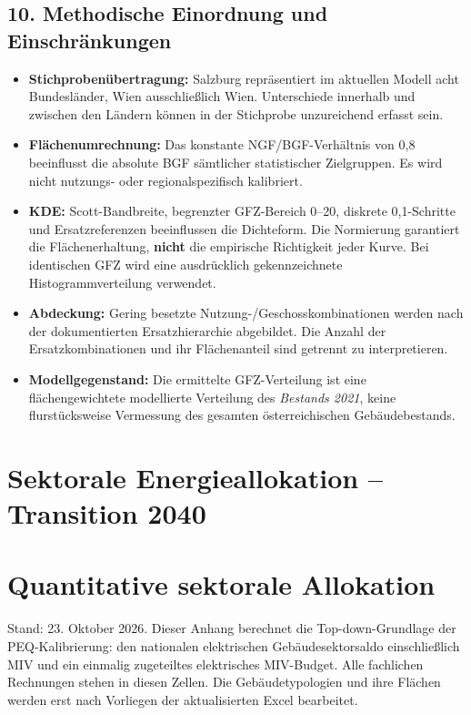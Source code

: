 \documentclass[
  ngerman,
  a4paper,
  DIV=11]{scrreprt}
\providecommand{\tightlist}{%
  \setlength{\itemsep}{0pt}\setlength{\parskip}{0pt}}
\begin{document}
\section{10. Methodische Einordnung und
Einschränkungen}\label{methodische-einordnung-und-einschruxe4nkungen}

\begin{itemize}
\tightlist
\item
  \textbf{Stichprobenübertragung:} Salzburg repräsentiert im aktuellen
  Modell acht Bundesländer, Wien ausschließlich Wien. Unterschiede
  innerhalb und zwischen den Ländern können in der Stichprobe
  unzureichend erfasst sein.
\item
  \textbf{Flächenumrechnung:} Das konstante NGF/BGF-Verhältnis von 0,8
  beeinflusst die absolute BGF sämtlicher statistischer Zielgruppen. Es
  wird nicht nutzungs- oder regionalspezifisch kalibriert.
\item
  \textbf{KDE:} Scott-Bandbreite, begrenzter GFZ-Bereich 0--20, diskrete
  0,1-Schritte und Ersatzreferenzen beeinflussen die Dichteform. Die
  Normierung garantiert die Flächenerhaltung, \textbf{nicht} die
  empirische Richtigkeit jeder Kurve. Bei identischen GFZ wird eine
  ausdrücklich gekennzeichnete Histogrammverteilung verwendet.
\item
  \textbf{Abdeckung:} Gering besetzte Nutzung-/Geschosskombinationen
  werden nach der dokumentierten Ersatzhierarchie abgebildet. Die Anzahl
  der Ersatzkombinationen und ihr Flächenanteil sind getrennt zu
  interpretieren.
\item
  \textbf{Modellgegenstand:} Die ermittelte GFZ-Verteilung ist eine
  flächengewichtete modellierte Verteilung des \emph{Bestands 2021},
  keine flurstücksweise Vermessung des gesamten österreichischen
  Gebäudebestands.
\end{itemize}

\chapter{Sektorale Energieallokation -- Transition
2040}\label{sektorale-energieallokation-transition-2040}

\chapter{Quantitative sektorale
Allokation}\label{sec-allokation-notebook}

Stand: 23. Oktober 2026. Dieser Anhang berechnet die Top-down-Grundlage
der PEQ-Kalibrierung: den nationalen elektrischen Gebäudesektorsaldo
einschließlich MIV und ein einmalig zugeteiltes elektrisches MIV-Budget.
Alle fachlichen Rechnungen stehen in diesen Zellen. Die
Gebäudetypologien und ihre Flächen werden erst nach Vorliegen der
aktualisierten Excel bearbeitet.
\end{document}
